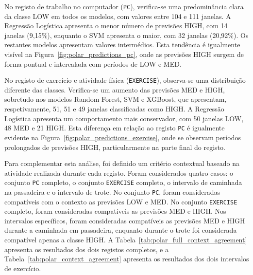 No registo de trabalho no computador (\texttt{PC}), verifica-se uma predominância clara da classe LOW em todos os modelos, com valores entre 104 e 111 janelas. A Regressão Logística apresenta o menor número de previsões HIGH, com 14 janelas (9,15\%), enquanto o SVM apresenta o maior, com 32 janelas (20,92\%). Os restantes modelos apresentam valores intermédios. Esta tendência é igualmente visível na Figura~\ref{fig:polar_predictions_pc}, onde as previsões HIGH surgem de forma pontual e intercalada com períodos de LOW e MED.

No registo de exercício e atividade física (\texttt{EXERCISE}), observa-se uma distribuição diferente das classes. Verifica-se um aumento das previsões MED e HIGH, sobretudo nos modelos Random Forest, SVM e XGBoost, que apresentam, respetivamente, 51, 51 e 49 janelas classificadas como HIGH. A Regressão Logística apresenta um comportamento mais conservador, com 50 janelas LOW, 48 MED e 21 HIGH. Esta diferença em relação ao registo \texttt{PC} é igualmente evidente na Figura~\ref{fig:polar_predictions_exercise}, onde se observam períodos prolongados de previsões HIGH, particularmente na parte final do registo.

Para complementar esta análise, foi definido um critério contextual baseado na atividade realizada durante cada registo. Foram considerados quatro casos: o conjunto \texttt{PC} completo, o conjunto \texttt{EXERCISE} completo, o intervalo de caminhada na passadeira e o intervalo de trote. No conjunto \texttt{PC}, foram consideradas compatíveis com o contexto as previsões LOW e MED. No conjunto \texttt{EXERCISE} completo, foram consideradas compatíveis as previsões MED e HIGH. Nos intervalos específicos, foram consideradas compatíveis as previsões MED e HIGH durante a caminhada em passadeira, enquanto durante o trote foi considerada compatível apenas a classe HIGH. A Tabela~\ref{tab:polar_full_context_agreement} apresenta os resultados dos dois registos completos, e a Tabela~\ref{tab:polar_context_agreement} apresenta os resultados dos dois intervalos de exercício.

